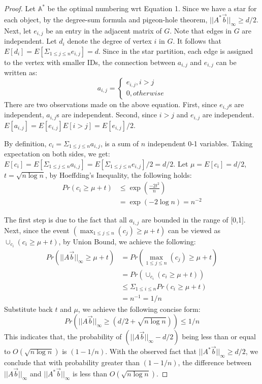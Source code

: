 \begin{proof}
Let $\mathbb{A}^*$ be the optimal numbering wrt Equation 1. Since we have a star
for each object, by the degree-sum formula and pigeon-hole theorem, $||A^*\vec{b}||_\infty \geq d/2$.
Next, let $e_{i,j}$ be an entry in the adjacent matrix of $G$. Note that edges in $G$ are independent. 
Let $d_i$ denote the degree of vertex $i$ in $G$. 
It follows that $E[d_i]=E[\Sigma_{1\leq j \leq n}e_{i,j}]=d$.
Since in the star partition, each edge is assigned to the vertex
with smaller IDs, the connection between $a_{i,j}$ and $e_{i,j}$ can be written as:
\begin{equation*}
a_{i,j} = \begin{cases}
			e_{i,j}, i>j \\
			0, otherwise
		  \end{cases}  
\end{equation*}
There are two observations made on the above equation. First, since $e_{i,j}$s are independent,
$a_{i,j}$s are independent. Second, since $i>j$ and $e_{i,j}$ are independent. 
$E[a_{i,j}] = E[e_{i,j}]E[i>j]= E[e_{i,j}]/2$.

By definition, $c_i = \Sigma_{1\leq j \leq n} a_{i,j}$, 
is a sum of $n$ independent 0-1 variables. Taking expectation on both sides, 
we get: $E[c_i] = E[\Sigma_{1\leq j \leq n} a_{i,j}]=E[\Sigma_{1\leq j \leq n} e_{i,j}]/2 = d/2$. Let $\mu =E[c_i] = d/2$, 
$t = \sqrt{n\log n}$, by Hoeffding's Inequality, the following holds:
\begin{equation*}
\begin{split}
	Pr(c_i \geq \mu + t) 
						&\leq \exp(\frac{-2t^2}{n}) \\
						&= \exp(-2\log n) = n^{-2}
\end{split}
\end{equation*}

The first step is due to the fact that all $a_{i,j}$ are bounded in the range of [0,1]. 
Next, since the event $(\max_{1 \leq j \leq n}(c_j) \geq \mu + t)$ can be viewed as
$\cup_{c_i} (c_i \geq \mu + t )$, by Union Bound, we achieve the following:
\begin{equation*}
\begin{split}
	Pr(||A\vec{b}||_\infty \geq \mu + t) &=Pr(\max_{1\leq j \leq n}(c_j) \geq \mu + t)  \\
		& = Pr(\cup_{c_i} (c_i \geq \mu + t )) \\
		&\leq \Sigma_{1 \leq i \leq n} Pr(c_i \geq \mu + t) \\
		& = n^{-1} = 1/n
\end{split}
\end{equation*}
Substitute back $t$ and $\mu$, we achieve the following concise form:
\begin{equation*}
	Pr(||A\vec{b}||_\infty \geq (d/2 + \sqrt{n\log n})) \leq 1/n
\end{equation*}
This indicates that, the probability of $(||A\vec{b}||_\infty-d/2)$ being less than or equal to $ O(\sqrt{n\log n})$ is $(1-1/n)$. With the observed fact that $||A^*\vec{b}||_\infty \geq d/2$, we conclude that
with probability greater than $(1-1/n)$, 
the difference between $||A\vec{b}||_\infty$ and $||A^*\vec{b}||_\infty$ is less than $O(\sqrt{n\log n})$.
\end{proof}


